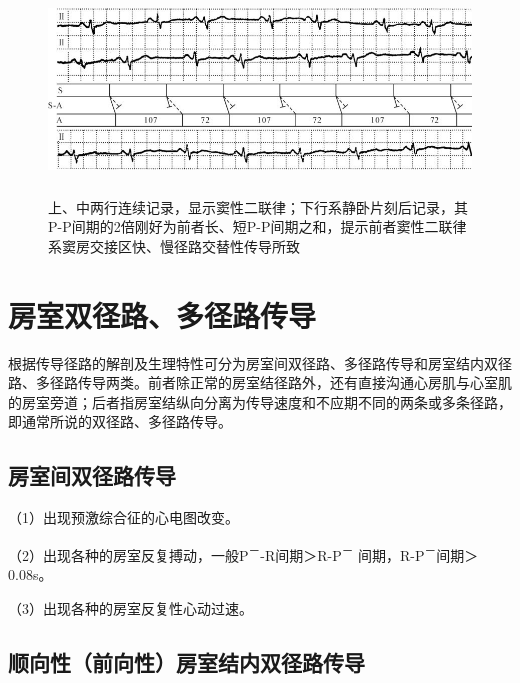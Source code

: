 \begin{figure}[!htbp]
 \centering
 \includegraphics[width=5.69792in,height=2.16667in]{./images/Image00413.jpg}
 \captionsetup{justification=centering}
 \caption{上、中两行连续记录，显示窦性二联律；下行系静卧片刻后记录，其P-P间期的2倍刚好为前者长、短P-P间期之和，提示前者窦性二联律系窦房交接区快、慢径路交替性传导所致}
 \label{fig25-2}
  \end{figure} 

\protect\hypertarget{text00032.htmlux5cux23subid380}{}{}

\section{房室双径路、多径路传导}

根据传导径路的解剖及生理特性可分为房室间双径路、多径路传导和房室结内双径路、多径路传导两类。前者除正常的房室结径路外，还有直接沟通心房肌与心室肌的房室旁道；后者指房室结纵向分离为传导速度和不应期不同的两条或多条径路，即通常所说的双径路、多径路传导。

\protect\hypertarget{text00032.htmlux5cux23subid381}{}{}

\subsection{房室间双径路传导}

（1）出现预激综合征的心电图改变。

（2）出现各种的房室反复搏动，一般P\textsuperscript{－}-R间期＞R-P\textsuperscript{－} 间期，R-P\textsuperscript{－}间期＞0.08s。

（3）出现各种的房室反复性心动过速。

\protect\hypertarget{text00032.htmlux5cux23subid382}{}{}

\subsection{顺向性（前向性）房室结内双径路传导}

